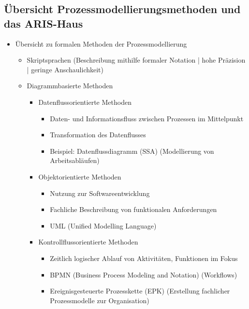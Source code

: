 \documentclass[11pt,a4paper]{article}
\begin{document}
\subsection{Übersicht Prozessmodellierungsmethoden und das ARIS-Haus}
\begin{itemize}

	\item Übersicht zu formalen Methoden der Prozessmodellierung
		\begin{itemize}
		\item Skriptsprachen (Beschreibung mithilfe formaler Notation | hohe Präzision | geringe Anschaulichkeit)	
		\item Diagrammbasierte Methoden
			\begin{itemize}
			\item Datenflussorientierte Methoden
				\begin{itemize}
				\item Daten- und Informationsfluss zwischen Prozessen im Mittelpunkt
				\item Transformation des Datenflusses
				\item Beispiel: Datenflussdiagramm (SSA) (Modellierung von Arbeitsabläufen)
				\end{itemize}
			
			\item Objektorientierte Methoden
				\begin{itemize}
				\item Nutzung zur Softwareentwicklung
				\item Fachliche Beschreibung von funktionalen Anforderungen
				\item UML (Unified Modelling Language)
				\end{itemize}
				
			\item Kontrollflussorientierte Methoden
				\begin{itemize}
				\item Zeitlich logischer Ablauf von Aktivitäten, Funktionen im Fokus
				\item BPMN (Business Process Modeling and Notation) (Workflows)
				\item Ereignisgesteuerte Prozesskette (EPK) (Erstellung fachlicher Prozessmodelle zur Organisation)
				\end{itemize}							
			
			\end{itemize}				
		
		\end{itemize}
		

\end{itemize}
\end{document}
